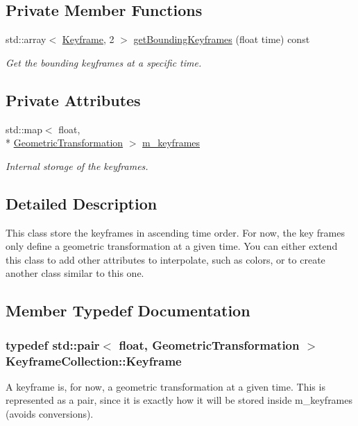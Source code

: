 \subsection*{Private Member Functions}
\begin{DoxyCompactItemize}
\item 
std\+::array$<$ \hyperlink{classKeyframeCollection_a06ac3762e94d3485f093371d0ee8d0c9}{Keyframe}, 2 $>$ \hyperlink{classKeyframeCollection_ab482950c2cdaa0ad1ec27eb1f0d49b4d}{get\+Bounding\+Keyframes} (float time) const 
\begin{DoxyCompactList}\small\item\em Get the bounding keyframes at a specific time. \end{DoxyCompactList}\end{DoxyCompactItemize}
\subsection*{Private Attributes}
\begin{DoxyCompactItemize}
\item 
std\+::map$<$ float, \\*
\hyperlink{classGeometricTransformation}{Geometric\+Transformation} $>$ \hyperlink{classKeyframeCollection_a157e3b47f4d1016d0f62ccb8abc5bc82}{m\+\_\+keyframes}
\begin{DoxyCompactList}\small\item\em Internal storage of the keyframes. \end{DoxyCompactList}\end{DoxyCompactItemize}


\subsection{Detailed Description}
This class store the keyframes in ascending time order. For now, the key frames only define a geometric transformation at a given time. You can either extend this class to add other attributes to interpolate, such as colors, or to create another class similar to this one. 

\subsection{Member Typedef Documentation}
\hypertarget{classKeyframeCollection_a06ac3762e94d3485f093371d0ee8d0c9}{
\subsubsection[{Keyframe}]{\setlength{\rightskip}{0pt plus 5cm}typedef std\+::pair$<$ float, {\bf Geometric\+Transformation} $>$ {\bf Keyframe\+Collection\+::\+Keyframe}\hspace{0.3cm}{\ttfamily [private]}}}\label{classKeyframeCollection_a06ac3762e94d3485f093371d0ee8d0c9}
A keyframe is, for now, a geometric transformation at a given time. This is represented as a pair, since it is exactly how it will be stored inside m\+\_\+keyframes (avoids conversions). 

